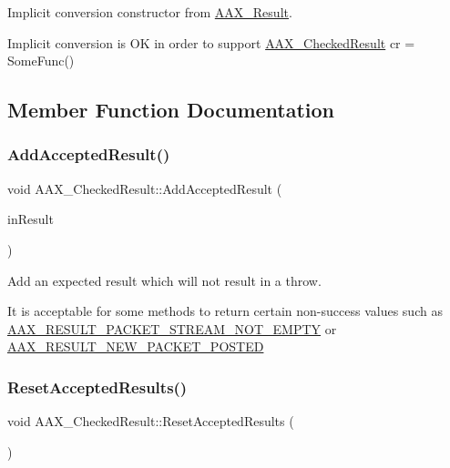 Implicit conversion constructor from \mbox{\hyperlink{a00392_a4d8f69a697df7f70c3a8e9b8ee130d2f}{A\+A\+X\+\_\+\+Result}}. 

Implicit conversion is OK in order to support \mbox{\hyperlink{a01601}{A\+A\+X\+\_\+\+Checked\+Result}} cr = Some\+Func() 

\subsection{Member Function Documentation}
\mbox{\label{a01601_af6c4b10c55e959f5f8424514a3cbb68a}} 
\subsubsection{\texorpdfstring{AddAcceptedResult()}{AddAcceptedResult()}}
{\footnotesize\ttfamily void A\+A\+X\+\_\+\+Checked\+Result\+::\+Add\+Accepted\+Result (\begin{DoxyParamCaption}\item[{\mbox{\hyperlink{a00392_a4d8f69a697df7f70c3a8e9b8ee130d2f}{A\+A\+X\+\_\+\+Result}}}]{in\+Result }\end{DoxyParamCaption})\hspace{0.3cm}{\ttfamily [inline]}}



Add an expected result which will not result in a throw. 

It is acceptable for some methods to return certain non-\/success values such as \mbox{\hyperlink{a00494_a5f8c7439f3a706c4f8315a9609811937a400d9332b820436d544b658523dacbf0}{A\+A\+X\+\_\+\+R\+E\+S\+U\+L\+T\+\_\+\+P\+A\+C\+K\+E\+T\+\_\+\+S\+T\+R\+E\+A\+M\+\_\+\+N\+O\+T\+\_\+\+E\+M\+P\+TY}} or \mbox{\hyperlink{a00494_a5f8c7439f3a706c4f8315a9609811937a00457e5c8c821b4f15f102b7c7154c97}{A\+A\+X\+\_\+\+R\+E\+S\+U\+L\+T\+\_\+\+N\+E\+W\+\_\+\+P\+A\+C\+K\+E\+T\+\_\+\+P\+O\+S\+T\+ED}} \mbox{\label{a01601_a14a7d7cab3e771a38481a7ab5447ea52}} 
\subsubsection{\texorpdfstring{ResetAcceptedResults()}{ResetAcceptedResults()}}
{\footnotesize\ttfamily void A\+A\+X\+\_\+\+Checked\+Result\+::\+Reset\+Accepted\+Results (\begin{DoxyParamCaption}{ }\end{DoxyParamCaption})\hspace{0.3cm}{\ttfamily [inline]}}



